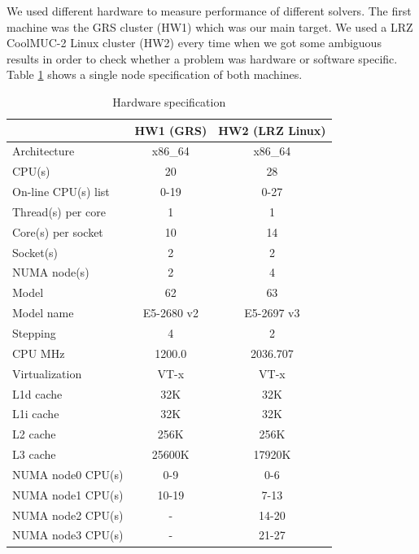 We used different hardware to measure performance of different solvers. The first machine was the GRS cluster (HW1) which was our main target. We used a LRZ CoolMUC-2 Linux cluster (HW2) every time when we got some ambiguous results in order to check whether a problem was hardware or software specific. Table \ref{table:hardware-spec} shows a single node specification of both machines.\\



\begin{table}[ht]
\centering
\begin{tabular}{|l|c|c|}
\hline
                    & HW1 (GRS) & HW2 (LRZ Linux) \\ \hline
Architecture        & x86\_64 & x86\_64 \\ \hline
CPU(s)              & 20 &  28 \\ \hline
On-line CPU(s) list & 0-19 &  0-27 \\ \hline
Thread(s) per core  & 1 &  1 \\  \hline
Core(s) per socket  & 10 & 14 \\ \hline
Socket(s)           & 2 &  2 \\ \hline
NUMA node(s)        & 2 &  4 \\ \hline
Model               & 62 &  63 \\ \hline
Model name          & E5-2680 v2 & 
E5-2697 v3 \\ \hline
Stepping            & 4 &  2 \\ \hline
CPU MHz             & 1200.0 &  2036.707 \\ \hline
Virtualization      & VT-x &  VT-x \\ \hline
L1d cache           & 32K &  32K \\ \hline
L1i cache           & 32K &  32K \\ \hline
L2 cache            & 256K &  256K \\ \hline
L3 cache            & 25600K &  17920K \\ \hline
NUMA node0 CPU(s)   & 0-9 &  0-6 \\ \hline
NUMA node1 CPU(s)   & 10-19 &  7-13 \\ \hline
NUMA node2 CPU(s)   & - &  14-20 \\ \hline
NUMA node3 CPU(s)   & - &  21-27 \\ \hline
\end{tabular}
\caption{Hardware specification}
\label{table:hardware-spec}
\end{table}


